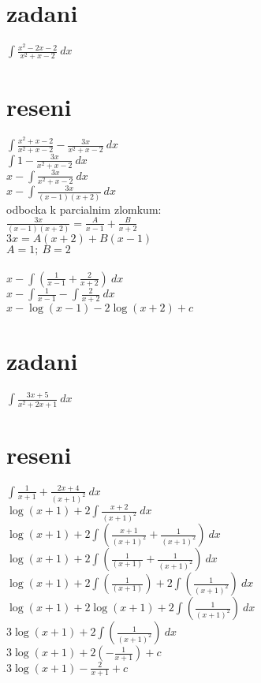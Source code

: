 \documentclass[a4paper]{article}
\def\doubleunderline#1{\underline{\underline{#1}}}
\begin{document}
\section*{zadani}
$\int \frac{x^2-2x-2}{x^2+x-2}~dx$

\section*{reseni}
$\int \frac{x^2+x-2}{x^2+x-2}-\frac{3x}{x^2+x-2}~dx$\\
$\int 1-\frac{3x}{x^2+x-2}~dx$\\
$x - \int \frac{3x}{x^2+x-2}~dx$\\
$x - \int \frac{3x}{(x-1)(x+2)}~dx$\\
odbocka k parcialnim zlomkum:\\
$\frac{3x}{(x-1)(x+2)} = \frac{A}{x-1}+\frac{B}{x+2}$\\
$3x = A(x+2)+B(x-1)$\\
$A=1;~B=2$\\
\\
$x - \int (\frac{1}{x-1} + \frac{2}{x+2})~dx$\\
$x - \int \frac{1}{x-1} - \int \frac{2}{x+2}~dx$\\
\doubleunderline{$x - \log(x-1) - 2\log(x+2)+c$}\\









\section*{zadani}
$\int \frac{3x+5}{x^2+2x+1}~dx$

\section*{reseni}
$\int \frac{1}{x+1} + \frac{2x+4}{(x+1)^2}~dx$\\
$\log(x+1) + 2\int \frac{x+2}{(x+1)^2}~dx$\\
$\log(x+1) + 2\int (\frac{x+1}{(x+1)^2}+\frac{1}{(x+1)^2})~dx$\\
$\log(x+1) + 2\int (\frac{1}{(x+1)}+\frac{1}{(x+1)^2})~dx$\\
$\log(x+1) + 2\int (\frac{1}{(x+1)}) + 2\int(\frac{1}{(x+1)^2})~dx$\\
$\log(x+1) + 2\log(x+1) + 2\int(\frac{1}{(x+1)^2})~dx$\\
$3\log(x+1) + 2\int(\frac{1}{(x+1)^2})~dx$\\
$3\log(x+1) + 2(-\frac{1}{x+1}) + c$\\
\doubleunderline{$3\log(x+1) - \frac{2}{x+1} + c$}\\
\end{document}

